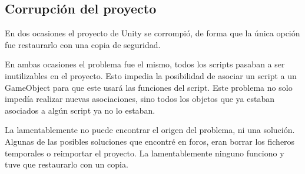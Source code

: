 \subsection{Corrupción del proyecto}

En dos ocasiones el proyecto de Unity se corrompió, de forma que la única opción fue restaurarlo con una copia de seguridad. 

En ambas ocasiones el problema fue el mismo, todos los scripts pasaban a ser inutilizables en el proyecto. Esto impedia la posibilidad de asociar un script a un GameObject para que este usará las funciones del script. Este problema no solo impedía realizar nuevas asociaciones, sino todos los objetos que ya estaban asociados a algún script ya no lo estaban.

La lamentablemente no puede encontrar el origen del problema, ni una solución. Algunas de las posibles soluciones que encontré en foros, eran borrar los ficheros temporales o reimportar el proyecto. La lamentablemente ninguno funciono y tuve que restaurarlo con un copia. 




